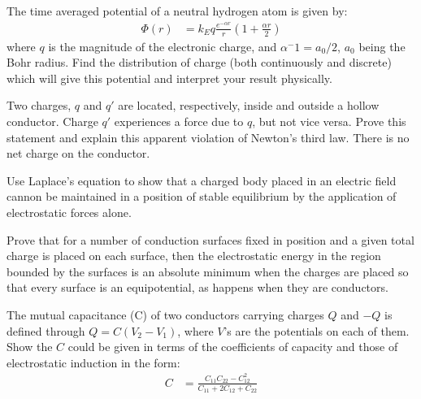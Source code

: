 \documentclass{jhwhw}
\begin{document}
The time averaged potential of a neutral hydrogen atom is given by:
\begin{align}
    \Phi(r) &= k_E q \frac{e^{-\alpha r}}{r} \left(1 + \frac{\alpha r}{2} \right)
\end{align}
where $q$ is the magnitude of the electronic charge, and $\alpha^-1 = a_0 / 2$, $a_0$ being the Bohr radius.  Find the distribution of charge (both continuously and discrete) which will give this potential and interpret your result physically.

\problem{}
Two charges, $q$ and $q'$ are located, respectively, inside and outside a hollow conductor.  Charge $q'$ experiences a force due to $q$, but not vice versa.  Prove this statement and explain this apparent violation of Newton's third law.  There is no net charge on the conductor.  

Use Laplace's equation to show that a charged body placed in an electric field cannon be maintained in a position of stable equilibrium by the application of electrostatic forces alone.

Prove that for a number of conduction surfaces fixed in position and a given total charge is placed on each surface, then the electrostatic energy in the region bounded by the surfaces is an absolute minimum when the charges are placed so that every surface is an equipotential, as happens when they are conductors.

\problem{}
The mutual capacitance (C) of two conductors carrying charges $Q$ and $-Q$ is defined through $Q = C (V_2 - V_1)$, where $V$'s are the potentials on each of them.  Show the $C$ could be given in terms of the coefficients of capacity and those of electrostatic induction in the form:
\begin{align}
    C &= \frac{C_{11}C_{22} - C^2_{12}}{C_{11}+2C_{12}+C_{22}}
\end{align}
\end{document}
